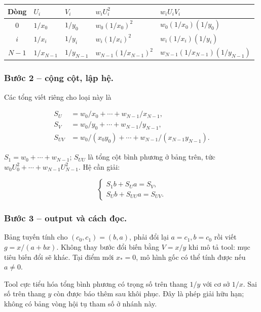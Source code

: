 \begin{center}\small\begin{tabular}{cllll}\toprule

Dòng&$U_i$&$V_i$&$w_iU_i^2$&$w_iU_iV_i$\\\midrule

$0$&$1/x_0$&$1/y_0$&$w_{0}(1/x_0)^2$&$w_{0}(1/x_0)(1/y_0)$\\

$i$&$1/x_{i}$&$1/y_{i}$&$w_{i}(1/x_{i})^2$&$w_{i}(1/x_{i})(1/y_{i})$\\

$N-1$&$1/x_{N-1}$&$1/y_{N-1}$&$w_{N-1}(1/x_{N-1})^2$&$w_{N-1}(1/x_{N-1})(1/y_{N-1})$\\

\bottomrule\end{tabular}\end{center}

\subsubsection*{Bước 2 -- cộng cột, lập hệ.} Các tổng viết riêng cho loại này là

\begin{align*}S_U&=w_0/x_0+\cdots+w_{N-1}/x_{N-1},\\S_V&=w_0/y_0+\cdots+w_{N-1}/y_{N-1},\\S_{UV}&=w_0/(x_0y_0)+\cdots+w_{N-1}/(x_{N-1}y_{N-1}).\end{align*}

$S_1=w_0+\cdots+w_{N-1}$; $S_{UU}$ là tổng cột bình phương ở bảng trên, tức $w_0U_0^2+\cdots+w_{N-1}U_{N-1}^2$. Hệ cần giải:

\[\boxed{\begin{cases}S_1b+S_Ua=S_V,\\S_Ub+S_{UU}a=S_{UV}.\end{cases}}\]

\subsubsection*{Bước 3 -- output và cách đọc.} Bảng tuyến tính cho $(c_0,c_1)=(b,a)$, phải đổi lại $a=c_1,b=c_0$ rồi viết $g=x/(a+bx)$. Không thay bước đổi biến bằng $V=x/y$ khi mô tả tool: mục tiêu biến đổi sẽ khác. Tại điểm mới $x_*=0$, mô hình gốc có thể tính được nếu $a\ne0$.

Tool cực tiểu hóa tổng bình phương có trọng số trên thang $1/y$ với cơ sở $1/x$. Sai số trên thang $y$ còn được báo thêm sau khôi phục. Đây là phép giải hữu hạn; không có bảng vòng hội tụ tham số ở nhánh này.

